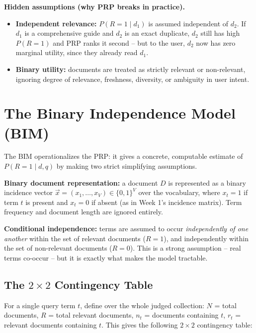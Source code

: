 \documentclass[11pt, a4paper]{article}
\begin{document}
\textbf{Hidden assumptions (why PRP breaks in practice).}
\begin{itemize}
\item \textbf{Independent relevance:} $P(R=1\mid d_1)$ is assumed independent of $d_2$. If $d_1$ is a comprehensive guide and $d_2$ is an exact duplicate, $d_2$ still has high $P(R=1)$ and PRP ranks it second -- but to the user, $d_2$ now has zero marginal utility, since they already read $d_1$.
\item \textbf{Binary utility:} documents are treated as strictly relevant or non-relevant, ignoring degree of relevance, freshness, diversity, or ambiguity in user intent.
\end{itemize}
\section{The Binary Independence Model (BIM)}

The BIM operationalizes the PRP: it gives a concrete, computable estimate of $P(R=1\mid d,q)$ by making two strict simplifying assumptions.

\begin{defbox}
\textbf{Binary document representation:} a document $D$ is represented as a binary incidence vector $\vec{x} = (x_1,\dots,x_V) \in \{0,1\}^V$ over the vocabulary, where $x_t=1$ if term $t$ is present and $x_t=0$ if absent (as in Week 1's incidence matrix). Term frequency and document length are ignored entirely.

\textbf{Conditional independence:} terms are assumed to occur \emph{independently of one another} within the set of relevant documents ($R=1$), and independently within the set of non-relevant documents ($R=0$). This is a strong assumption -- real terms co-occur -- but it is exactly what makes the model tractable.
\end{defbox}

\subsection{The $2\times2$ Contingency Table}

For a single query term $t$, define over the whole judged collection: $N$ = total documents, $R$ = total relevant documents, $n_t$ = documents containing $t$, $r_t$ = relevant documents containing $t$. This gives the following $2\times2$ contingency table:
\end{document}
